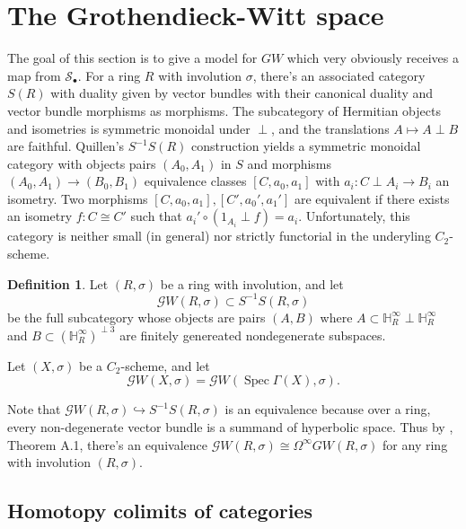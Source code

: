 \documentclass[edeposit,fullpage]{uiucthesis2009}
\newcommand{\mbb}{\mathbb}
\newcommand{\mc}{\mathcal}
\DeclareMathOperator{\Spec}{Spec}
\theoremstyle{plain}
\numberwithin{lemma}{section}
\theoremstyle{definition}
\newtheorem{definition}[lemma]{Definition}
\begin{document}

\section{The Grothendieck-Witt space}


The goal of this section is to give a model for $GW$ which very
obviously receives a map from $\mc S_\bullet$. For a ring $R$ with involution $\sigma$, there's an associated
category $S(R)$ with duality given by vector bundles
with their canonical duality and vector bundle morphisms as
morphisms. The subcategory of Hermitian objects and isometries is symmetric monoidal under $\perp$, and the translations
$A \mapsto A \perp B$ are faithful. Quillen's $S^{-1}S(R)$ construction
yields a symmetric monoidal category with objects pairs $(A_0,A_1)$ in
$S$ and morphisms $(A_0,A_1) \rightarrow (B_0,B_1)$ equivalence
classes $[C,a_0,a_1]$ with $a_i : C \perp A_i \rightarrow B_i$ an
isometry. Two morphisms $[C,a_0,a_1], [C',a_0',a_1']$ are equivalent
if there exists an isometry $f : C \cong C'$ such that $a_i'\circ
(1_{A_i} \perp f) = a_i$. Unfortunately, this category is neither
small (in general) nor strictly functorial in
the underyling $C_2$-scheme. 

\begin{definition}
Let $(R,\sigma)$ be a ring with involution, and let
\[
\mathscr GW(R,\sigma) \subset S^{-1}S(R,\sigma)
\]
be the full subcategory whose objects are pairs $(A,B)$ where $A
\subset \mbb H^\infty_R \perp \mbb H^\infty_R$ and $B \subset (\mbb
H^\infty_R)^{\perp 3}$ are finitely genereated nondegenerate
subspaces. 

Let $(X,\sigma)$ be a $C_2$-scheme, and let
\[
\mathscr GW(X,\sigma) = \mathscr GW(\Spec \Gamma(X),\sigma).
\]
\end{definition}

Note that $\mathscr GW(R,\sigma) \hookrightarrow S^{-1}S(R,\sigma)$ is
an equivalence because over a ring, every non-degenerate vector bundle
is a summand of hyperbolic space. Thus by \cite{Schder}, Theorem A.1, there's an equivalence
$\mathscr GW(R,\sigma) \cong \Omega^\infty GW(R,\sigma)$ for any ring
with involution $(R,\sigma)$. 

\subsection{Homotopy colimits of categories}
\end{document}
